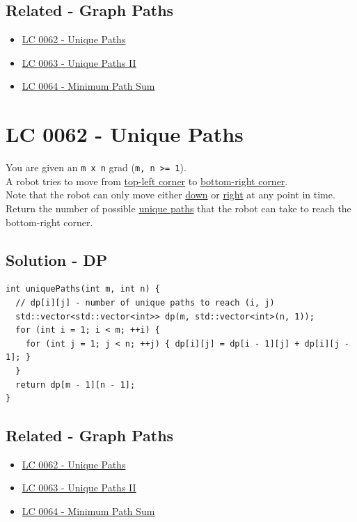 \subsection*{Related - Graph Paths}
\begin{itemize}
	\item \hyperref[lc0062]{LC 0062 - Unique Paths}
	\item \hyperref[lc0063]{LC 0063 - Unique Paths II}
	\item \hyperref[lc0064]{LC 0064 - Minimum Path Sum}
\end{itemize}

\section{LC 0062 - Unique Paths}\label{lc0062}
You are given an {\colorbox{CodeBackground}{\lstinline|m x n|}} grad ({\colorbox{CodeBackground}{\lstinline|m, n >= 1|}}).\\

A robot tries to move from \ul{top-left corner} to \ul{bottom-right corner}. \\

Note that the robot can only move either \ul{down} or \ul{right} at any point in time.\\

Return the number of possible \ul{unique paths} that the robot can take to reach the bottom-right corner.\\

\subsection*{Solution - DP}
\begin{lstlisting}
int uniquePaths(int m, int n) {
  // dp[i][j] - number of unique paths to reach (i, j)
  std::vector<std::vector<int>> dp(m, std::vector<int>(n, 1));
  for (int i = 1; i < m; ++i) {
    for (int j = 1; j < n; ++j) { dp[i][j] = dp[i - 1][j] + dp[i][j - 1]; }
  }
  return dp[m - 1][n - 1];
}
\end{lstlisting}

\subsection*{Related - Graph Paths}
\begin{itemize}
	\item \hyperref[lc0062]{LC 0062 - Unique Paths}
	\item \hyperref[lc0063]{LC 0063 - Unique Paths II}
	\item \hyperref[lc0064]{LC 0064 - Minimum Path Sum}
\end{itemize}

